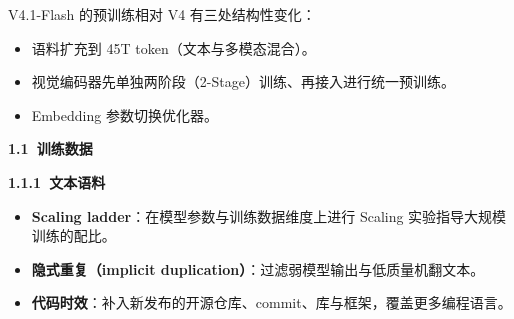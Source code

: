\documentclass[zihao=false,fontset=windows]{ctexart}
\begin{document}
V4.1-Flash 的预训练相对 V4 有三处结构性变化：\par
\begin{itemize}
\item 
语料扩充到 45T token（文本与多模态混合）。\par
\item 
视觉编码器先单独两阶段（2-Stage）训练、再接入进行统一预训练。\par
\item 
Embedding 参数切换优化器。\par
\end{itemize}

\par{}\vspace{0.8em}\noindent \begin{tcolorbox}[boxrule=0pt,arc=3pt,colback=callOrange,left=3pt,right=3pt,top=2pt,bottom=2pt,before skip=0pt,after skip=0pt]{\bfseries \textcolor{feishuBlue}{1.1}\ 训练数据}\end{tcolorbox}\par\vspace{0.28em}

\par{}\vspace{0.8em}\noindent \begin{tcolorbox}[boxrule=0pt,arc=3pt,colback=callGreen,left=3pt,right=3pt,top=2pt,bottom=2pt,before skip=0pt,after skip=0pt]{\bfseries \textcolor{feishuBlue}{1.1.1}\ 文本语料}\end{tcolorbox}\par\vspace{0.28em}
\begin{itemize}
\item 
\textbf{Scaling ladder}：在模型参数与训练数据维度上进行 Scaling 实验指导大规模训练的配比。\par
\item 
\textbf{隐式重复（implicit duplication）}：过滤弱模型输出与低质量机翻文本。\par
\item 
\textbf{代码时效}：补入新发布的开源仓库、commit、库与框架，覆盖更多编程语言。\par
\end{itemize}
\end{document}
